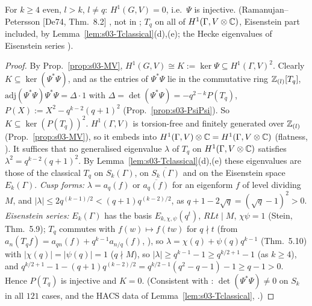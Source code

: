 \begin{lemma}[$H^1(G,V)=0$]\label{lem:s03-H1G}
For $k\ge4$ even, $l>k$, $l\ne q$: $H^1(G,V)=0$, i.e.\ $\Psi$ is injective. \stpmc{} (Ramanujan--Petersson [De74, Thm.~8.2] \stcited{}, not in
; $T_q$ on all of $H^1(\Gamma,V\otimes\mathbb{C})$, Eisenstein part included, by Lemma~\ref{lem:s03-Tclassical}(d),(e); the Hecke eigenvalues of Eisenstein series
 \stcited).
\end{lemma}
\begin{proof}
By Prop.~\ref{prop:s03-MV}, $H^1(G,V)\cong K:=\ker\Psi\subseteq H^1(\Gamma,V)^2$. Clearly $K\subseteq\ker(\Psi^*\Psi)$, and as the entries of $\Psi^*\Psi$ lie in the commutative
ring $\mathbb{Z}_{(l)}[T_q]$, $\mathrm{adj}(\Psi^*\Psi)\Psi^*\Psi=\Delta\cdot1$ with $\Delta=\det(\Psi^*\Psi)=-q^{2-k}P(T_q)$, $P(X):=X^2-q^{k-2}(q+1)^2$ (Prop.~\ref{prop:s03-PsiPsi}). So
$K\subseteq\ker(P(T_q))^2$. $H^1(\Gamma,V)$ is torsion-free and finitely generated over $\mathbb{Z}_{(l)}$ (Prop.~\ref{prop:s03-MV}), so it embeds into
$H^1(\Gamma,V)\otimes\mathbb{C}=H^1(\Gamma,V\otimes\mathbb{C})$ (flatness, ). It suffices
that no generalised eigenvalue $\lambda$ of $T_q$ on $H^1(\Gamma,V\otimes\mathbb{C})$ satisfies $\lambda^2=q^{k-2}(q+1)^2$. By Lemma~\ref{lem:s03-Tclassical}(d),(e)
these eigenvalues are those of the classical $T_q$ on $S_k(\Gamma)$, on $\overline{S_k(\Gamma)}$ and on the Eisenstein space $E_k(\Gamma)$.
\emph{Cusp forms:} $\lambda=a_q(f)$ or $\overline{a_q(f)}$ for an eigenform $f$ of level dividing $M$, and $|\lambda|\le2q^{(k-1)/2}<(q+1)q^{(k-2)/2}$, as
$q+1-2\sqrt q=(\sqrt q-1)^2>0$. \emph{Eisenstein series:} $E_k(\Gamma)$ has the basis $E_{k,\chi,\psi}(q^t)$, $RLt\mid M$, $\chi\psi=1$ (Stein, Thm.~5.9); $T_q$ commutes with $f(w)\mapsto f(tw)$ for $q\nmid t$
(from $a_n(T_qf)=a_{qn}(f)+q^{k-1}a_{n/q}(f)$,  \stcited), so
$\lambda=\chi(q)+\psi(q)q^{k-1}$ (Thm.~5.10) with $|\chi(q)|=|\psi(q)|=1$ ($q\nmid M$), so
$|\lambda|\ge q^{k-1}-1\ge q^{k/2+1}-1$ (as $k\ge4$), and $q^{k/2+1}-1-(q+1)q^{(k-2)/2}=q^{k/2-1}(q^2-q-1)-1\ge q-1>0$. Hence $P(T_q)$ is injective and $K=0$.
(Consistent with : $\det(\Psi^*\Psi)\ne0$ on $S_k$ in all $121$ cases, and the HACS data of Lemma~\ref{lem:s03-Tclassical}, \stcomp.)
\end{proof}

